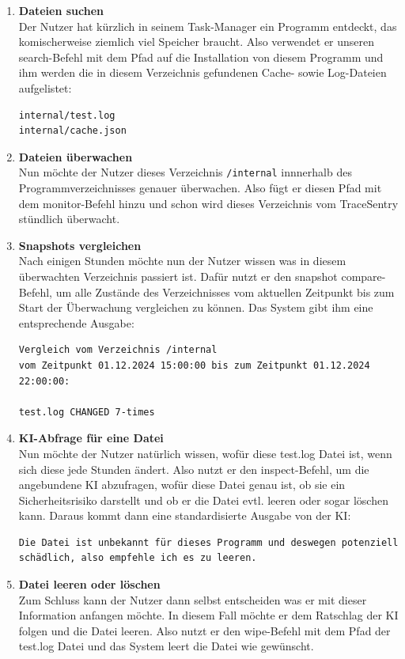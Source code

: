\documentclass[a4paper,12pt]{report}
\begin{document}
    \begin{enumerate}
        \item \textbf{Dateien suchen}\\
        Der Nutzer hat kürzlich in seinem Task-Manager ein Programm entdeckt, das komischerweise
        ziemlich viel Speicher braucht.
        Also verwendet er unseren search-Befehl mit dem Pfad auf die Installation von diesem Programm
        und ihm werden die in diesem Verzeichnis gefundenen Cache- sowie Log-Dateien aufgelistet:
        \begin{verbatim}
internal/test.log
internal/cache.json
        \end{verbatim}

        \item \textbf{Dateien überwachen}\\
        Nun möchte der Nutzer dieses Verzeichnis \texttt{/internal} innnerhalb des Programmverzeichnisses genauer überwachen.
        Also fügt er diesen Pfad mit dem monitor-Befehl hinzu und schon wird dieses Verzeichnis vom TraceSentry stündlich überwacht.

        \item \textbf{Snapshots vergleichen}\\
        Nach einigen Stunden möchte nun der Nutzer wissen was in diesem überwachten Verzeichnis passiert ist.
        Dafür nutzt er den snapshot compare-Befehl, um alle Zustände des Verzeichnisses vom aktuellen Zeitpunkt bis zum Start der Überwachung vergleichen zu können.
        Das System gibt ihm eine entsprechende Ausgabe:
        \begin{verbatim}
Vergleich vom Verzeichnis /internal
vom Zeitpunkt 01.12.2024 15:00:00 bis zum Zeitpunkt 01.12.2024 22:00:00:

test.log CHANGED 7-times
        \end{verbatim}

        \item \textbf{KI-Abfrage für eine Datei}\\
        Nun möchte der Nutzer natürlich wissen, wofür diese test.log Datei ist, wenn sich diese jede Stunden ändert.
        Also nutzt er den inspect-Befehl, um die angebundene KI abzufragen, wofür diese Datei genau ist, ob sie ein Sicherheitsrisiko darstellt
        und ob er die Datei evtl. leeren oder sogar löschen kann.
        Daraus kommt dann eine standardisierte Ausgabe von der KI:
        \begin{verbatim}
Die Datei ist unbekannt für dieses Programm und deswegen potenziell
schädlich, also empfehle ich es zu leeren.
        \end{verbatim}

        \item \textbf{Datei leeren oder löschen}\\
        Zum Schluss kann der Nutzer dann selbst entscheiden was er mit dieser Information anfangen möchte.
        In diesem Fall möchte er dem Ratschlag der KI folgen und die Datei leeren.
        Also nutzt er den wipe-Befehl mit dem Pfad der test.log Datei und das System leert die Datei wie gewünscht.
    \end{enumerate}
\end{document}
